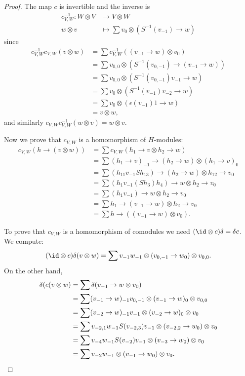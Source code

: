 \documentclass[12pt]{amsproc}
\begin{document}
\begin{proof}
The map $c$ is invertible and the inverse is 
\begin{align*}
c_{V,W}^{-1}:W\otimes V & \to V\otimes W\\
w\otimes v & \mapsto \sum v_{0}\otimes(S^{-1}(v_{-1})\to w)
\end{align*}
since
\begin{align*}
c_{V,W}^{-1}c_{V,W}(v\otimes w) & =\sum c_{V,W}^{-1}((v_{-1}\to w)\otimes v_{0})\\
 & =\sum v_{0,0}\otimes(S^{-1}(v_{0,-1})\to(v_{-1}\to w))\\
 & =\sum v_{0,0}\otimes(S^{-1}(v_{0,-1})v_{-1}\to w)\\
 & =\sum v_{0}\otimes(S^{-1}(v_{-1})v_{-2}\to w)\\
 & =\sum v_{0}\otimes(\epsilon(v_{-1})1\to w)\\
 & =v\otimes w,
\end{align*}
and similarly $c_{V,W}c_{V,W}^{-1}(w\otimes v)=w\otimes v$. 

Now we prove that $c_{V,W}$ is a homomorphism of $H$-modules: 
\begin{align*}
c_{V,W}(h\rightarrow (v\otimes w))&=\sum c_{V,W}(h_1\rightarrow v\otimes h_2\rightarrow w)\\
&=\sum (h_1\rightarrow v)_{-1}\rightarrow(h_2\rightarrow w)\otimes(h_1\rightarrow v)_0\\
&=\sum (h_{11}v_{-1}Sh_{13})\rightarrow(h_2\rightarrow w)\otimes h_{12}\rightarrow v_0\\
&=\sum (h_1v_{-1}(Sh_3)h_4)\rightarrow w\otimes h_2\rightarrow v_0\\
&=\sum (h_1v_{-1})\rightarrow w\otimes h_2\rightarrow v_0\\
&=\sum h_1\rightarrow(v_{-1}\rightarrow w)\otimes h_2\rightarrow v_0\\
&=\sum h\rightarrow((v_{-1}\rightarrow w)\otimes v_0).
\end{align*}

To prove that $c_{V,W}$ is a homomorphism of comodules we need $(\id\otimes
c)\delta=\delta c$.  We compute:
\[
(\id\otimes c)\delta(v\otimes w)=\sum v_{-1}w_{-1}\otimes (v_{0,-1}\rightarrow w_0)\otimes v_{0,0}.
\]
On the other hand,
\begin{align*}
\delta(c(v\otimes w)&=\sum\delta(v_{-1}\rightarrow w\otimes v_0)\\
&=\sum (v_{-1}\rightarrow w)_{-1}v_{0,-1}\otimes(v_{-1}\rightarrow w)_0\otimes v_{0,0}\\
&=\sum (v_{-2}\rightarrow w)_{-1}v_{-1}\otimes (v_{-2}\rightarrow w)_0\otimes v_0\\
&=\sum v_{-2,1}w_{-1}S(v_{-2,3})v_{-1}\otimes(v_{-2,2}\rightarrow w_0)\otimes v_0\\
&=\sum v_{-4}w_{-1}S(v_{-2})v_{-1}\otimes (v_{-3}\rightarrow w_0)\otimes v_0\\
&=\sum v_{-2}w_{-1}\otimes(v_{-1}\rightarrow w_0)\otimes v_0.\qedhere
\end{align*}
\end{proof}
\end{document}
